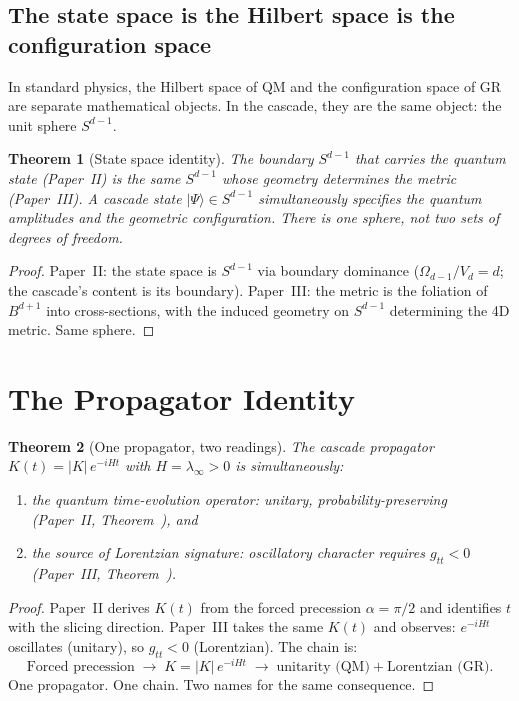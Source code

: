 \documentclass[12pt,a4paper]{article}
\newtheorem{theorem}{Theorem}[section]
\begin{document}
\subsection{The state space is the Hilbert space is the configuration space}

In standard physics, the Hilbert space of QM and the configuration space of GR
are separate mathematical objects. In the cascade, they are the same object:
the unit sphere $S^{d-1}$.

\begin{theorem}[State space identity]\label{thm:statespace}
The boundary $S^{d-1}$ that carries the quantum state (Paper~II) is the
same $S^{d-1}$ whose geometry determines the metric (Paper~III). A cascade
state $|\Psi\rangle \in S^{d-1}$ simultaneously specifies the quantum
amplitudes and the geometric configuration. There is one sphere, not two
sets of degrees of freedom.
\end{theorem}

\begin{proof}
Paper~II: the state space is $S^{d-1}$ via boundary dominance
($\Omega_{d-1}/V_d = d$; the cascade's content is its boundary).
Paper~III: the metric is the foliation of $B^{d+1}$ into cross-sections,
with the induced geometry on $S^{d-1}$ determining the 4D metric.
Same sphere.
\end{proof}

\section{The Propagator Identity}

\begin{theorem}[One propagator, two readings]\label{thm:propagator}
The cascade propagator $K(t) = |K|\,e^{-iHt}$ with $H = \lambda_\infty > 0$
is simultaneously:
\begin{enumerate}
\item the quantum time-evolution operator: unitary, probability-preserving
(Paper~II, Theorem~), and
\item the source of Lorentzian signature: oscillatory character requires
$g_{tt} < 0$ (Paper~III, Theorem~).
\end{enumerate}
\end{theorem}

\begin{proof}
Paper~II derives $K(t)$ from the forced precession $\alpha = \pi/2$ and
identifies $t$ with the slicing direction. Paper~III takes the same $K(t)$
and observes: $e^{-iHt}$ oscillates (unitary), so $g_{tt} < 0$
(Lorentzian). The chain is:
\[
\text{Forced precession} \;\to\; K = |K|\,e^{-iHt}
\;\to\; \text{unitarity (QM)} + \text{Lorentzian (GR)}.
\]
One propagator. One chain. Two names for the same consequence.
\end{proof}
\end{document}
